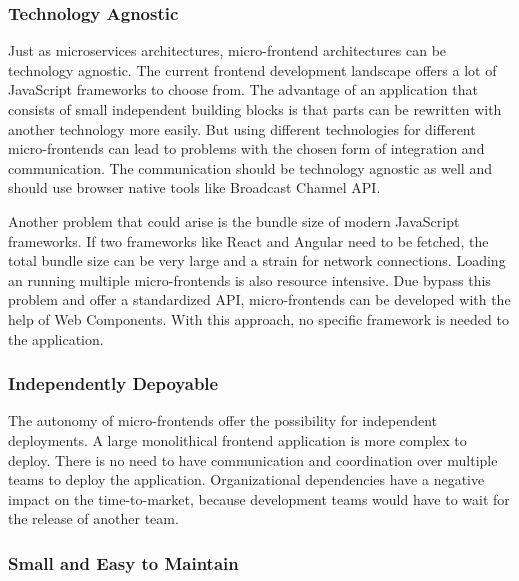 \subsubsection{Technology Agnostic}

Just as microservices architectures, micro-frontend architectures can be technology agnostic. The current frontend development landscape offers a lot of JavaScript frameworks to choose from. The advantage of an application that consists of small independent building blocks is that parts can be rewritten with another technology more easily. \cite[14-16]{book:2020:geers:background:micro-frontends:micro-frontends-in-action} But using different technologies for different micro-frontends can lead to problems with the chosen form of integration and communication. The communication should be technology agnostic as well and should use browser native tools like Broadcast Channel API.

\bigskip

\noindent Another problem that could arise is the bundle size of modern JavaScript frameworks. If two frameworks like React and Angular need to be fetched, the total bundle size can be very large and a strain for network connections. Loading an running multiple micro-frontends is also resource intensive. Due bypass this problem and offer a standardized API, micro-frontends can be developed with the help of Web Components. With this approach, no specific framework is needed to the application. \cite{book:2020:geers:background:micro-frontends:micro-frontends-in-action}

\subsubsection{Independently Depoyable}

The autonomy of micro-frontends offer the possibility for independent deployments. A large monolithical frontend application is more complex to deploy. There is no need to have communication and coordination over multiple teams to deploy the application. Organizational dependencies have a negative impact on the time-to-market, because development teams would have to wait for the release of another team. \cite[12]{book:2020:geers:background:micro-frontends:micro-frontends-in-action}

\subsubsection{Small and Easy to Maintain}

